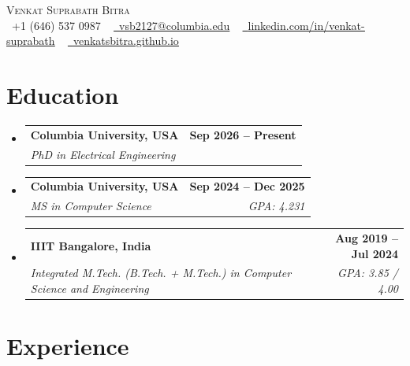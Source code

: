 \documentclass[letterpaper,11pt]{article}
\makeatletter
\newcommand{\resumeSubheading}[4]{
  \vspace{-2pt}\item
    \begin{tabular*}{1.0\textwidth}[t]{l@{\extracolsep{\fill}}r}
      \textbf{#1} & \textbf{\small #2} \\
      \textit{\small#3} & \textit{\small #4} \\
    \end{tabular*}\vspace{-7pt}
}
\newcommand{\resumeSubHeadingListStart}{\begin{itemize}[leftmargin=0.0in, label={}]}
\newcommand{\resumeSubHeadingListEnd}{\end{itemize}}
\makeatother
\begin{document}
\begin{center}
    {\Huge \scshape Venkat Suprabath Bitra} \\ \vspace{1pt}
    \small \raisebox{-0.1\height}\faPhone\ +1 (646) 537 0987 ~ \href{mailto:vsb2127@columbia.edu}{\raisebox{-0.2\height}\faEnvelope\  \underline{vsb2127@columbia.edu}} ~
    \href{https://linkedin.com/in/venkat-suprabath/}{\raisebox{-0.2\height}\faLinkedin\ \underline{linkedin.com/in/venkat-suprabath}}  ~
    \href{https://venkatsbitra.github.io/}{\raisebox{-0.2\height}\faGithub\ \underline{venkatsbitra.github.io}}
    \vspace{-8pt}
\end{center}

\section{Education}

\resumeSubHeadingListStart
\resumeSubheading{Columbia University, USA}{Sep 2026 -- Present}{PhD in Electrical Engineering}{}
\resumeSubheading{Columbia University, USA}{Sep 2024 -- Dec 2025}{MS in Computer Science}{GPA: 4.231}
\resumeSubheading{IIIT Bangalore, India}{Aug 2019 -- Jul 2024}{Integrated
M.Tech. (B.Tech. + M.Tech.) in Computer Science and Engineering}{GPA: 3.85 / 4.00}
\resumeSubHeadingListEnd

\section{Experience}

\end{document}
